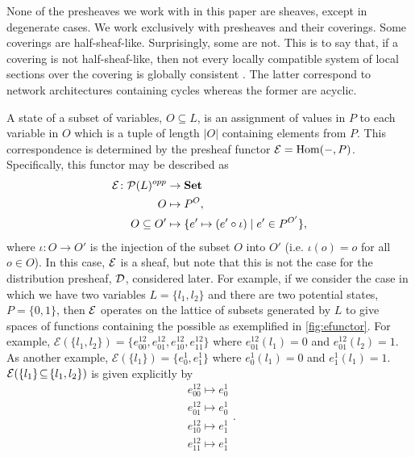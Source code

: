 None of the presheaves we work with in this paper are sheaves, except in degenerate cases. We work exclusively with presheaves and their coverings. Some coverings are half-sheaf-like. Surprisingly, some are not. This is to say that, if a covering is not half-sheaf-like, then not every locally compatible system of local sections over the covering is globally consistent \cite{Boole1862,Vorobev1962,Bell1964,EthanAkin389,Abramsky2011}. The latter correspond to network architectures containing cycles whereas the former are acyclic.

\noindent\makebox[\linewidth]{\rule{\paperwidth}{0.4pt}}

A state of a subset of variables, $O \subseteq L$, is an assignment of values in $P$ to each variable in $O$ which is a tuple of length $|O|$ containing elements from $P$. This correspondence is determined by the presheaf functor $\mathcal{E} = \mathrm{Hom}(-,P)$.  Specifically, this functor may be described as
\begin{equation}\label{eq:gpfunctor}
\begin{split}
\expr \colon \mathcal{P}(L)^{opp} &\to \mathbf{Set} \\
O &\mapsto P^O,\\
O \subseteq O' &\mapsto \{ e' \mapsto (e' \circ \iota) \mid e' \in P^{O'}\}, %
\end{split}
\end{equation}
where $\iota \colon O \rightarrow O'$ is the injection of the subset $O$ into $O'$ (i.e. $\iota (o) = o$ for all $o \in O$). In this case, $\mathcal{E}$ is a sheaf, but note that this is not the case for the distribution presheaf, $\mathcal{D}$, considered later.
For example, if we consider the case in which we have two variables $L=\{l_1,l_2\}$ and there are two potential states, $P=\{0,1\}$, then $\mathcal{E}$ operates on the lattice of subsets generated by $L$ to give spaces of functions containing the possible \gnpm{} as exemplified in \autoref{fig:efunctor}.
For example, $\mathcal{E}(\{l_1,l_2\}) = \{ e^{12}_{00},e^{12}_{01},e^{12}_{10},e^{12}_{11} \}$ where $e^{12}_{01}(l_1) = 0$ and $e^{12}_{01}(l_2) = 1$. As another example, $\mathcal{E}(\{l_1\}) = \{ e^{1}_{0},e^{1}_{1} \}$ where $e^{1}_{0}(l_1)=0$ and $e^{1}_{1}(l_1)=1$. $\mathcal{E} ( \{ l_1 \} \! \subseteq \! \{ l_1, l_2 \} )$ is given explicitly by
\begin{equation}
\begin{aligned}
e^{12}_{00} \mapsto e^{1}_{0}\\
e^{12}_{01} \mapsto e^{1}_{0}\\
e^{12}_{10} \mapsto e^{1}_{1}\\
e^{12}_{11} \mapsto e^{1}_{1}
\end{aligned}.
\end{equation}

